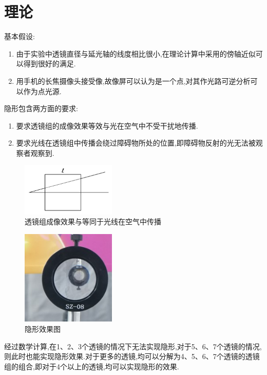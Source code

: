 \documentclass[UTF8]{gapd}
\begin{document}
\section{理论}
基本假设:
\begin{enumerate}
  \item 由于实验中透镜直径与延光轴的线度相比很小,在理论计算中采用的傍轴近似可以得到很好的满足.
  \item 用手机的长焦摄像头接受像,故像屏可以认为是一个点,对其作光路可逆分析可以作为点光源.
\end{enumerate}

隐形包含两方面的要求:
\begin{enumerate}
  \item 要求透镜组的成像效果等效与光在空气中不受干扰地传播.
  \item 要求光线在透镜组中传播会绕过障碍物所处的位置,即障碍物反射的光无法被观察者观察到.
\end{enumerate}
\begin{figure}
  \centering
  \includegraphics[width=0.4\textwidth]{images/2.jpg}
  \caption{透镜组成像效果与等同于光线在空气中传播}
  \label{fig:2}
\end{figure}
\begin{figure}
  \centering
  \includegraphics[width=0.4\textwidth]{images/3.jpg}
  \caption{隐形效果图}
\end{figure}
经过数学计算,在1、2、3个透镜的情况下无法实现隐形,对于5、6、7个透镜的情况,则此时也能实现隐形效果.对于更多的透镜,均可以分解为4、5、6、7个透镜的透镜组的组合,即对于4个以上的透镜,均可以实现隐形的效果.
\end{document}
